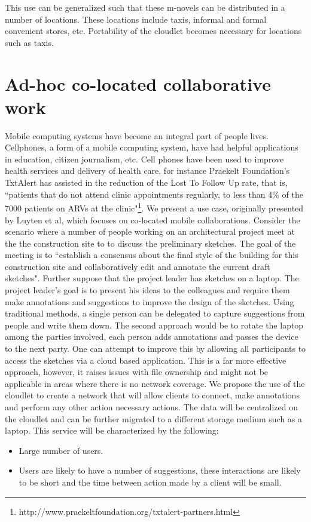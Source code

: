 This use can be generalized such that these m-novels can be distributed in a number of locations. These locations include taxis, informal and formal convenient stores, etc. Portability of the cloudlet becomes necessary for locations such as taxis.


\section{Ad-hoc co-located collaborative work}
Mobile computing systems have become an integral part of people lives. Cellphones, a form of a mobile computing system, have had helpful applications in education, citizen journalism, etc. Cell phones have been used to improve health services and delivery of health care, for instance Praekelt Foundation's TxtAlert has assisted in the reduction of the Lost To Follow Up rate, that is, ``patients that do not attend clinic appointments regularly, to less than 4\% of the 7000 patients on ARVs at the clinic"\footnote{http://www.praekeltfoundation.org/txtalert-partners.html}. We present a use case, originally presented by Luyten et al\cite{luyten2007ad}, which focuses on co-located mobile collaborations. Consider the scenario where a number of people working on an architectural project meet at the the construction
site to to discuss the preliminary sketches. The goal of the
meeting is to ``establish a consensus about the final style of
the building for this construction site and collaboratively
edit and annotate the current draft sketches"\cite[p. 507]{luyten2007ad}.
Further suppose that the project leader has sketches on a laptop.
The project leader's goal is to present his ideas to the colleagues
and require them make annotations and suggestions to improve the design of the sketches. Using traditional methods, a single person can be delegated to capture
suggestions from people and write them down. The second approach would be to
rotate the laptop among the parties involved, each
person adds annotations and passes the device to the next party. One can
attempt to improve this by allowing all participants to access the sketches via
a cloud based application. This is a far more effective approach, however,
it raises issues with file ownership and might not be applicable in areas where
there is no network coverage. We propose the use of the cloudlet to create a network that will allow clients to connect, make annotations and perform any other action necessary actions. The data will be centralized on the cloudlet and can be further migrated to a different storage medium such as a laptop. This service will be characterized by the following:

\begin{itemize}
\item Large number of users.
\item Users are likely to have a number of suggestions, these interactions are likely to be short and the time between action made by a client will be small.
\end{itemize}
